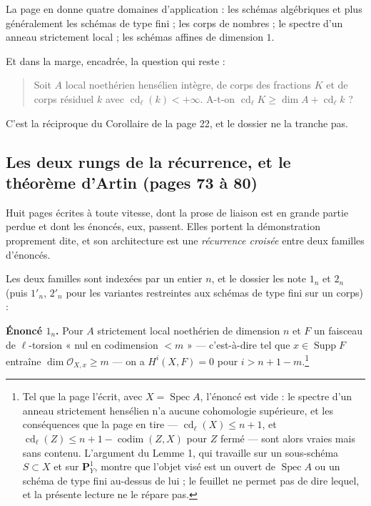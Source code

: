 \documentclass[11pt,a4paper]{article}
\begin{document}
La page en donne quatre domaines d'application : les schémas algébriques et plus
généralement les schémas de type fini ; les corps de nombres ; le spectre d'un
anneau strictement local ; les schémas affines de dimension $1$.

Et dans la marge, encadrée, la question qui reste :

\begin{quote}
Soit $A$ local noethérien hensélien intègre, de corps des fractions $K$ et de
corps résiduel $k$ avec $\operatorname{cd}_{\ell}(k) < +\infty$. A-t-on
$\operatorname{cd}_{\ell} K \geqslant \dim A + \operatorname{cd}_{\ell} k$ ?
\end{quote}

C'est la réciproque du Corollaire de la page 22, et le dossier ne la tranche
pas.

\subsection*{Les deux rungs de la récurrence, et le théorème d'Artin (pages 73 à 80)}

Huit pages écrites à toute vitesse, dont la prose de liaison est en grande partie
perdue et dont les énoncés, eux, passent. Elles portent la démonstration
proprement dite, et son architecture est une \emph{récurrence croisée} entre
deux familles d'énoncés.

Les deux familles sont indexées par un entier $n$, et le dossier les note
$1_n$ et $2_n$ (puis $1'_n$, $2'_n$ pour les variantes restreintes aux schémas
de type fini sur un corps) :

\textbf{Énoncé $1_n$.} Pour $A$ strictement local noethérien de dimension $n$ et
$F$ un faisceau de $\ell$-torsion « nul en codimension $< m$ » — c'est-à-dire
tel que $x \in \operatorname{Supp} F$ entraîne
$\dim \mathcal{O}_{X,x} \geqslant m$ — on a $H^i(X,F) = 0$ pour
$i > n+1-m$.\footnote{Tel que la page l'écrit, avec $X = \operatorname{Spec} A$,
l'énoncé est vide : le spectre d'un anneau strictement hensélien n'a aucune
cohomologie supérieure, et les conséquences que la page en tire —
$\operatorname{cd}_{\ell}(X) \leqslant n+1$, et
$\operatorname{cd}_{\ell}(Z) \leqslant n+1-\operatorname{codim}(Z,X)$ pour $Z$
fermé — sont alors vraies mais sans contenu. L'argument du Lemme 1, qui
travaille sur un sous-schéma $S \subset X$ et sur $\mathbf{P}^1_Y$, montre que
l'objet visé est un ouvert de $\operatorname{Spec} A$ ou un schéma de type fini
au-dessus de lui ; le feuillet ne permet pas de dire lequel, et la présente
lecture ne le répare pas.}
\end{document}
